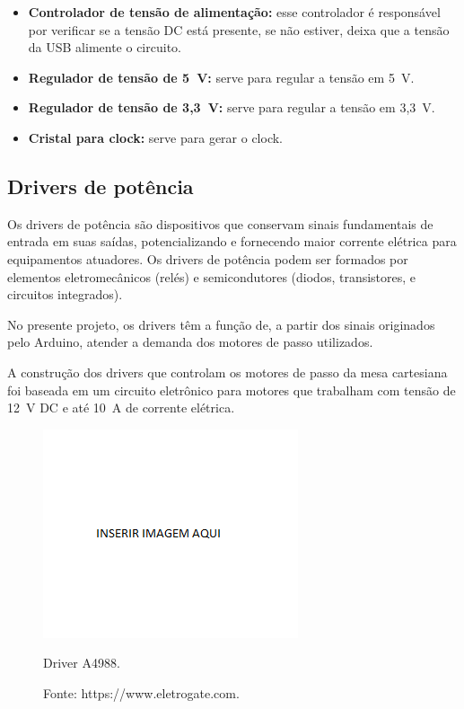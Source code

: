 \begin{itemize}
\item \textbf{Controlador de tensão de alimentação:} esse controlador é responsável por verificar se a tensão DC está presente, se não estiver, deixa que a tensão da \ac{USB} alimente o circuito. 
\item \textbf{Regulador de tensão de 5~V:} serve para regular a tensão em 5~V.
\item \textbf{Regulador de tensão de 3,3~V:} serve para regular a tensão em 3,3~V.
\item \textbf{Cristal para clock:} serve para gerar o clock.
\end{itemize}

\subsection{Drivers de potência}\label{subsec:metdriver}

Os drivers de potência são dispositivos que conservam sinais fundamentais de entrada em suas saídas, 
potencializando e fornecendo maior corrente elétrica para equipamentos atuadores. Os drivers de potência 
podem ser formados por elementos eletromecânicos (relés) e semicondutores (diodos, transistores, e 
circuitos integrados). 

No presente projeto, os drivers têm a função de, a partir dos sinais originados pelo Arduino, atender 
a demanda dos motores de passo utilizados.

A construção dos drivers que controlam os motores de passo da mesa cartesiana foi baseada em um 
circuito eletrônico para motores que trabalham com tensão de 12~V DC e até 10~A de corrente elétrica. 

\begin{figure}[H]
\centering
\includegraphics[width = 0.5\linewidth]{figuras/driver}
\caption{Driver A4988.}
\caption*{Fonte: https://www.eletrogate.com.}
\label{fig:driver}
\end{figure}

